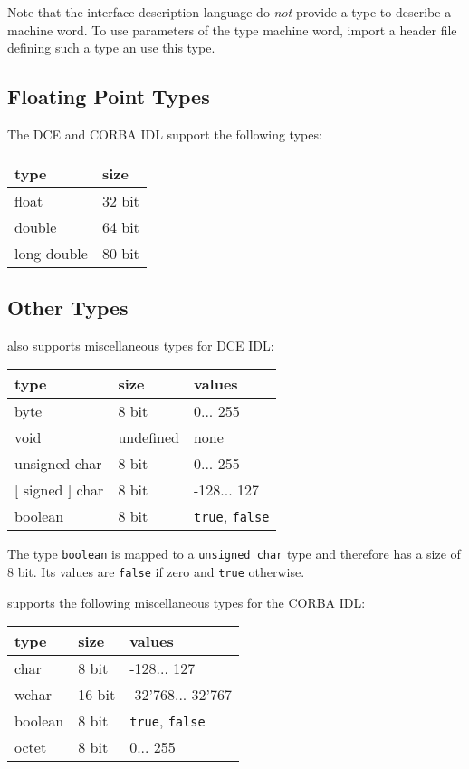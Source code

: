 Note that the interface description language do \emph{not} provide a type to
describe a machine word. To use parameters of the type machine word, import a
header file defining such a type an use this type.

\subsection{Floating Point Types}
The DCE and CORBA IDL support the following types:


\begin{center}
\begin{tabular}{|l|l|}
\hline
type & size \\ \hline
float & 32 bit \\
double & 64 bit \\
long double & 80 bit \\
\hline
\end{tabular}
\end{center}

\subsection{Other Types}

\dice{} also supports miscellaneous types for DCE IDL:

\begin{center}
\begin{tabular}{|l|l|l|}
\hline
type & size & values \\
\hline
byte & 8 bit & 0... 255 \\
void & undefined & none \\
unsigned char & 8 bit & 0... 255 \\
$[$ signed $]$ char & 8 bit & -128... 127 \\
boolean & 8 bit & {\tt true}, {\tt false} \\
\hline
\end{tabular}
\end{center}

The type {\tt boolean} is mapped to a {\tt unsigned char} type and therefore
has a size of 8 bit. Its values are {\tt false} if zero and {\tt true}
otherwise.

\dice{} supports the following miscellaneous types for the
CORBA IDL:

\begin{center}
\begin{tabular}{|l|l|l|}
\hline
type & size & values \\
\hline
char & 8 bit & -128... 127 \\
wchar & 16 bit & -32'768... 32'767 \\
boolean & 8 bit & {\tt true}, {\tt false} \\
octet & 8 bit & 0... 255 \\
\hline
\end{tabular}
\end{center}

